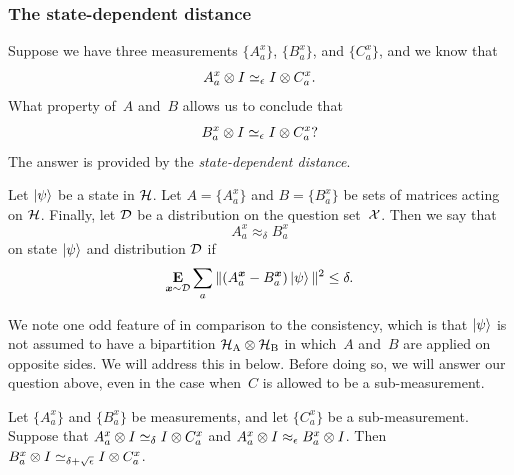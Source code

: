 \subsubsection{The state-dependent distance}

Suppose we have three measurements $\{A^x_a\}$, $\{B^x_a\}$, and $\{C^x_a\}$,
and we know that
\begin{equation*}
A^x_a \otimes I \simeq_{\epsilon} I \otimes C^x_a.
\end{equation*}
What property of~$A$ and~$B$ allows us to conclude that
\begin{equation}\label{eq:can-we-use-approx-delta-to-derive-this}
B^x_a \otimes I \simeq_{\epsilon} I \otimes C^x_a?
\end{equation}
The answer is provided by the \emph{state-dependent distance}.

\begin{definition}\label{def:approx_delta}
Let $\ket{\psi}$ be a state in $\mathcal{H}$.
Let $A = \{A^x_a\}$ and $B = \{B^x_a\}$ be
sets of matrices acting on $\mathcal{H}$.
Finally, let $\mathcal{D}$ be a distribution on the question set~$\mathcal{X}$.
Then we say that
  \begin{equation*}
  A^x_a \approx_{\delta}  B^x_a
  \end{equation*}
 on state $\ket{\psi}$ and distribution $\mathcal{D}$ if
  \begin{equation*}
  \mathop{\bf E\/}_{{\boldsymbol{x}} \sim \mathcal{D}} \sum_{a} \Vert (A^{{\boldsymbol{x}}}_a - B^{{\boldsymbol{x}}}_a) \ket{\psi} \Vert^2 \leq \delta.
    \end{equation*}
\end{definition}

We note one odd feature of  in comparison to the consistency,
which is that $\ket{\psi}$ is not assumed to have a bipartition $\mathcal{H}_{\mathrm{A}} \otimes \mathcal{H}_{\mathrm{B}}$
in which~$A$ and~$B$ are applied on opposite sides.
We will address this in  below.
Before doing so, we will answer our question above,
even in the case when~$C$ is allowed to be a sub-measurement. 

\begin{proposition}
Let $\{A^x_a\}$ and $\{B^x_a\}$ be measurements,
and let $\{C^x_a\}$ be a sub-measurement.
Suppose that $A^x_a \otimes I \simeq_{\delta} I \otimes C^x_a$
and $A^x_a \otimes I \approx_{\epsilon} B^x_a \otimes I$.
Then $B^x_a \otimes I \simeq_{\delta + \sqrt{\epsilon}} I \otimes C^x_a$.
  \label{prop:triangle-sub}
\end{proposition}


